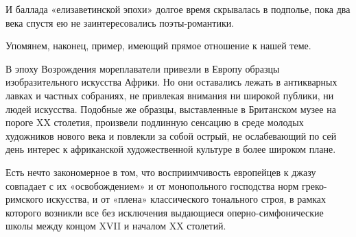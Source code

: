 И баллада  «елизаветинской эпохи» долгое время  скрывалась в подполье,
пока два века спустя ею не заинтересовались поэты-романтики.

Упомянем, наконец, пример, имеющий прямое отношение к нашей теме.

В   эпоху  Возрождения   мореплаватели  привезли   в  Европу   образцы
изобразительного  искусства   Африки.  Но  они  оставались   лежать  в
антикварных  лавках  и частных  собраниях,  не  привлекая внимания  ни
широкой публики, ни людей искусства. Подобные же образцы, выставленные
в Британском музее на пороге XX столетия, произвели подлинную сенсацию
в среде молодых художников нового века  и повлекли за собой острый, не
ослабевающий по сей день интерес к африканской художественной культуре
в более широком плане.

Есть  нечто  закономерное  в  том, что  восприимчивость  европейцев  к
джазу  совпадает с  их  «освобождением» и  от монопольного  господства
норм греко-римского  искусства, и от «плена»  классического тонального
строя,  в  рамках  которого  возникли все  без  исключения  выдающиеся
оперно-симфонические школы между концом XVII и началом XX столетий.

